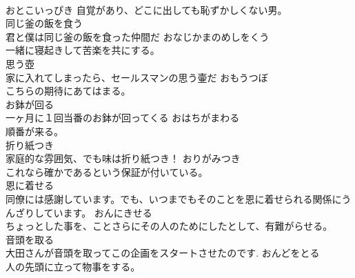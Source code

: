 \documentclass[8pt]{extreport}
\begin{document}
\begin{CJK}{UTF8}{min}
\\	おとこいっぴき			自覚があり、どこに出しても恥ずかしくない男。
\\	同じ釜の飯を食う	
\\	君と僕は同じ釜の飯を食った仲間だ	おなじかまのめしをくう	
\\	一緒に寝起きして苦楽を共にする。
\\	思う壺	
\\	家に入れてしまったら、セールスマンの思う壷だ	おもうつぼ		
\\	こちらの期待にあてはまる。
\\	お鉢が回る	
\\	一ヶ月に１回当番のお鉢が回ってくる	おはちがまわる		
\\	順番が来る。
\\	折り紙つき	
\\	家庭的な雰囲気、でも味は折り紙つき！	おりがみつき	
\\	これなら確かであるという保証が付いている。
\\	恩に着せる	
\\	同僚には感謝しています。でも、いつまでもそのことを恩に着せられる関係にうんざりしています。	おんにきせる		
\\	ちょっとした事を、ことさらにその人のためにしたとして、有難がらせる。
\\	音頭を取る	
\\	大田さんが音頭を取ってこの企画をスタートさせたのです.	おんどをとる		
\\	人の先頭に立って物事をする。
\end{CJK}
\end{document}
